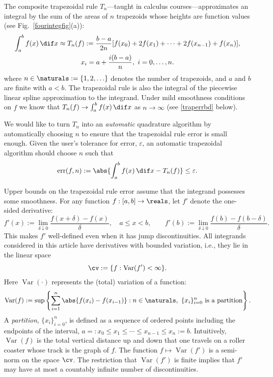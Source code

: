 \documentclass[]{article}
\DeclareMathOperator{\Var}{Var}
\DeclareMathOperator{\err}{err}
\theoremstyle{definition}
\theoremstyle{remark}
\newcommand{\datasites}{\{x_i\}_{i=0}^n}
\begin{document}
The composite trapezoidal rule $T_n$---taught in calculus courses---approximates an integral by the sum of the areas of $n$ trapezoids whose heights are function values (see Fig.\ \ref{fourintegfig}(a)):
\begin{multline}
\int_a^b f(x) \, \dif x \approx T_n(f) := \frac{b-a}{2n} [ f(x_0) + 2 f(x_1) + \cdots  + 2 f(x_{n-1}) + f(x_n)], \\
x_i=a+\frac{i(b-a)}{n}, \ i=0, \ldots, n.
\end{multline}
where $n \in \naturals := \{1, 2, \ldots \}$ denotes the number of trapezoids, and $a$ and $b$ are finite with $a<b$.  The trapezoidal rule is also the integral of the piecewise linear spline approximation to the integrand. Under mild smoothness conditions on $f$ we know that $T_n(f) \to \int_a^b f(x) \, \dif x$ as $n \to \infty$ (see \eqref{traperrbd} below). 

We would like to turn $T_n$ into an \emph{automatic} quadrature algorithm by automatically choosing $n$ to ensure that the trapezoidal rule error is small enough.  Given the user's tolerance for error, $\varepsilon$, an automatic trapezoidal algorithm should choose $n$ such that 
\begin{equation} \label{errdef}
\err(f,n) := \abs{\int_a^b f(x) \, \dif x - T_n(f)} \le \varepsilon.
\end{equation}

Upper bounds on the trapezoidal rule error assume that the integrand possesses some smoothness.  For any function $f:[a,b]\to \reals$, let $f'$ denote the one-sided derivative:
\[
f'(x):=\lim_{\delta \downarrow 0} \frac{f(x+\delta)-f(x)}{\delta}, \quad a \le x < b, \qquad f'(b):=\lim_{\delta \downarrow 0} \frac{f(b)-f(b-\delta)}{\delta}.
\]
This makes $f'$ well-defined even when it has jump discontinuities.  All integrands considered in this article have derivatives with bounded variation, i.e., they lie in the linear space
\[
\cv:=\{f : \Var(f')<\infty \}.
\]
Here $\Var(\cdot)$ represents the (total) variation of a function:
\begin{equation} \label{vardef}
\Var(f) \\
:= \sup \left \{ \sum_{i=1}^n \abs{f(x_i)-f(x_{i-1})} : n \in \naturals, \ \datasites \text{ is a partition} \right\}.
\end{equation}
A \emph{partition}, $\datasites$, is defined as a sequence of ordered points including the endpoints of the interval,  $a=:x_0 \le x_1 \le \cdots \le x_{n-1} \le x_{n}:=b$.  Intuitively, $\Var(f)$ is the total vertical distance up and down that one travels on a roller coaster whose track is the graph of $f$. The function $f \mapsto \Var(f')$ is a semi-norm on the space $\cv$. The restriction that $\Var(f')$ is finite implies that $f'$ may have at most a countably infinite number of discontinuities.
\end{document}
